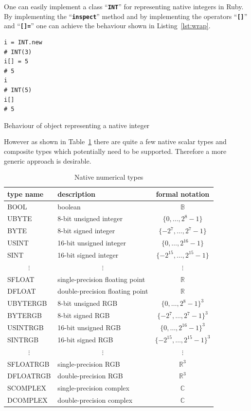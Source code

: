 \documentclass[10pt,journal,compsoc]{joser1}
\newcommand{\code}[1]{``\texttt{\textbf{\textcolor{codegray}{\small{#1}}}}''}
\newcommand{\tbl}[1]{Table~\ref{tbl:#1}}
\newcommand{\lst}[1]{Listing~\ref{lst:#1}}
\begin{document}
One can easily implement a class \code{INT} for representing native integers in
Ruby\citep{w2009}. By implementing the \code{inspect} method and by
implementing the operators \code{[]} and \code{[]=} one can achieve the
behaviour shown in \lst{wrap}.
\begin{listing}[htbp]
  \begin{verbatim}
i = INT.new
# INT(3)
i[] = 5
# 5
i
# INT(5)
i[]
# 5
  \end{verbatim}
  \caption{Behaviour of object representing a native integer\label{lst:wrap}}
\end{listing}
However as shown in \tbl{scalars} there are quite a few native scalar types and
composite types which potentially need to be supported. Therefore a more
generic approach is desirable.
\begin{table}[htbp]
  \begin{center}
    \caption{Native numerical types\label{tbl:scalars}}
    \begin{tabular}{llc}\toprule
    \textbf{type name} &
    \textbf{description} &
    \textbf{formal notation}\\\midrule
    BOOL      & boolean                  & $\mathbb{B}$\\
    UBYTE     & 8-bit unsigned integer   & $\{0,\ldots,2^8-1\}$\\
    BYTE      & 8-bit signed integer     & $\{-2^7,\ldots,2^7-1\}$\\
    USINT     & 16-bit unsigned integer  & $\{0,\ldots,2^{16}-1\}$\\
    SINT      & 16-bit signed integer    & $\{-2^{15},\ldots,2^{15}-1\}$\\
    \multicolumn{1}{c}{$\vdots$} & \multicolumn{1}{c}{$\vdots$} & $\vdots$\\
    SFLOAT    & single-precision floating point & $\mathbb{R}$\\
    DFLOAT    & double-precision floating point & $\mathbb{R}$\\
    UBYTERGB  & 8-bit unsigned RGB       & $\{0,\ldots,2^8-1\}^3$\\
    BYTERGB   & 8-bit signed RGB         & $\{-2^7,\ldots,2^7-1\}^3$\\
    USINTRGB  & 16-bit unsigned RGB      & $\{0,\ldots,2^{16}-1\}^3$\\
    SINTRGB   & 16-bit signed RGB        & $\{-2^{15},\ldots,2^{15}-1\}^3$\\
    \multicolumn{1}{c}{$\vdots$} & \multicolumn{1}{c}{$\vdots$} & $\vdots$\\
    SFLOATRGB & single-precision RGB     & $\mathbb{R}^3$\\
    DFLOATRGB & double-precision RGB     & $\mathbb{R}^3$\\
    SCOMPLEX  & single-precision complex & $\mathbb{C}$\\
    DCOMPLEX  & double-precision complex & $\mathbb{C}$\\\bottomrule
    \end{tabular}
  \end{center}
\end{table}
\end{document}
